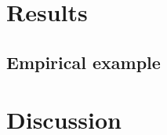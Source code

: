 \documentclass[Royal,sageapa,times,doublespace]{sagej}
\begin{document}
\newpage

\section{Results}

\subsection{Empirical example}
\section{Discussion}

\nocite{*}


\end{document}
